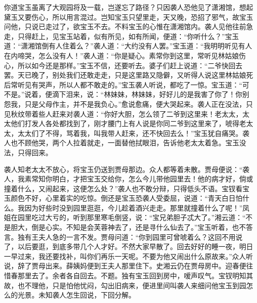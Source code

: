 \begin{parag}
    你道宝玉虽离了大观园将及一载，岂遂忘了路径？只因袭人恐他见了潇湘馆，想起黛玉又要伤心，所以用言混过。岂知宝玉只望里走，天又晚，恐招了邪气，故宝玉问他，只说已走过了，欲宝玉不去。不料宝玉的心惟在潇湘馆内。袭人见他往前急走，只得赶上，见宝玉站着，似有所见，如有所闻，便道：“你听什么？”宝玉道：“潇湘馆倒有人住着么？”袭人道：“大约没有人罢。”宝玉道：“我明明听见有人在内啼哭，怎么没有人！”袭人道：“你是疑心。素常你到这里，常听见林姑娘伤心，所以如今还是那样。”宝玉不信，还要听去。婆子们赶上说道：“二爷快回去罢。天已晚了，别处我们还敢走走，只是这里路又隐僻，又听得人说这里林姑娘死后常听见有哭声，所以人都不敢走的。”宝玉袭人听说，都吃了一惊。宝玉道：“可不是。”说着，便滴下泪来，说：“林妹妹，林妹妹，好好儿的是我害了你了！你别怨我，只是父母作主，并不是我负心。”愈说愈痛，便大哭起来。袭人正在没法，只见秋纹带着些人赶来对袭人道：“你好大胆，怎么领了二爷到这里来！老太太，太太他们打发人各处都找到了，刚才腰门上有人说是你同二爷到这里来了，唬得老太太，太太们了不得，骂着我，叫我带人赶来，还不快回去么！”宝玉犹自痛哭。袭人也不顾他哭，两个人拉着就走，一面替他拭眼泪，告诉他老太太着急。宝玉没法，只得回来。
\end{parag}


\begin{parag}
    袭人知老太太不放心，将宝玉仍送到贾母那边。众人都等着未散。贾母便说：“袭人，我素常知你明白，才把宝玉交给你，怎么今儿带他园里去！他的病才好，倘或撞着什么，又闹起来，这便怎么处？”袭人也不敢分辩，只得低头不语。宝钗看宝玉颜色不好，心里着实的吃惊。倒还是宝玉恐袭人受委屈，说道：“青天白日怕什么。我因为好些时没到园里逛逛，今儿趁着酒兴走走。那里就撞着什么了呢！”凤姐在园里吃过大亏的，听到那里寒毛倒竖，说：“宝兄弟胆子忒大了。”湘云道：“不是胆大，倒是心实。不知是会芙蓉神去了，还是寻什么仙去了。”宝玉听着，也不答言。独有王夫人急的一言不发。贾母问道：“你到园里可曾唬着么？这回不用说了，以后要逛，到底多带几个人才好。不然大家早散了。回去好好的睡一夜，明日一早过来，我还要找补，叫你们再乐一天呢。不要为他又闹出什么原故来。”众人听说，辞了贾母出来。薛姨妈便到王夫人那里住下。史湘云仍在贾母房中。迎春便往惜春那里去了。余者各自回去。不题。独有宝玉回到房中，嗳声叹气。宝钗明知其故，也不理他，只是怕他忧闷，勾出旧病来，便进里间叫袭人来细问他宝玉到园怎么的光景。未知袭人怎生回说，下回分解。
\end{parag}